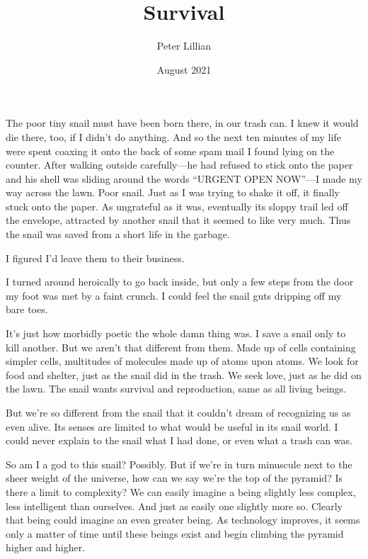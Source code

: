 \documentclass[12pt]{article}
\title{Survival \\[-6pt]}
\author{\vspace{-\baselineskip}Peter Lillian}
\date{\vspace{-\baselineskip}August 2021}
\newenvironment{quote_1in}%
  {\list{}{\leftmargin=1in\rightmargin=1in}\item[]}%
  {\endlist}
\begin{document}
\frenchspacing

\maketitle


    

The poor tiny snail must have been born there, in our trash can. I knew it would die there, too, if I didn’t do anything. And so the next ten minutes of my life were spent coaxing it onto the back of some spam mail I found lying on the counter. After walking outside carefully—he had refused to stick onto the paper and his shell was sliding around the words “URGENT OPEN NOW”—I made my way across the lawn. Poor snail. Just as I was trying to shake it off, it finally stuck onto the paper. As ungrateful as it was, eventually its sloppy trail led off the envelope, attracted by another snail that it seemed to like very much. Thus the snail was saved from a short life in the garbage.

I figured I’d leave them to their business.

I turned around heroically to go back inside, but only a few steps from the door my foot was met by a faint crunch. I could feel the snail guts dripping off my bare toes.

It’s just how morbidly poetic the whole damn thing was. I save a snail only to kill another. But we aren’t that different from them. Made up of cells containing simpler cells, multitudes of molecules made up of atoms upon atoms. We look for food and shelter, just as the snail did in the trash. We seek love, just as he did on the lawn. The snail wants survival and reproduction, same as all living beings.

But we’re so different from the snail that it couldn’t dream of recognizing us as even alive. Its senses are limited to what would be useful in its snail world. I could never explain to the snail what I had done, or even what a trash can was.

So am I a god to this snail? Possibly. But if we’re in turn minuscule next to the sheer weight of the universe, how can we say we’re the top of the pyramid? Is there a limit to complexity? We can easily imagine a being slightly less complex, less intelligent than ourselves. And just as easily one slightly more so. Clearly that being could imagine an even greater being. As technology improves, it seems only a matter of time until these beings exist and begin climbing the pyramid higher and higher.
\end{document}
